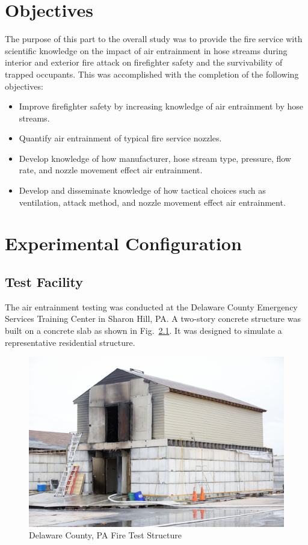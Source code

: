 \documentclass[12pt,oneside]{book}
\begin{document}
\chapter{Objectives}

The purpose of this part to the overall study was to provide the fire service with scientific knowledge on the impact of air entrainment in hose streams during interior and exterior fire attack on firefighter safety and the survivability of trapped occupants. This was accomplished with the completion of the following objectives:

\begin{itemize}
	\item Improve firefighter safety by increasing knowledge of air entrainment by hose streams.
	\item Quantify air entrainment of typical fire service nozzles. 
	\item Develop knowledge of how manufacturer, hose stream type, pressure, flow rate, and nozzle movement effect air entrainment.
	\item Develop and disseminate knowledge of how tactical choices such as ventilation, attack method, and nozzle movement effect air entrainment. 
	\end{itemize}


\chapter{Experimental Configuration}

\section{Test Facility}

The air entrainment testing was conducted at the Delaware County Emergency Services Training Center in Sharon Hill, PA. A two-story concrete structure was built on a concrete slab as shown in Fig.~\ref{fig:Delaware_County,_PA_Fire_Test_Structure}. It was designed to simulate a representative residential structure. 

\begin{figure}[!ht]
	\centering
	\includegraphics[width=\columnwidth]{Figures/Air_Entrainment/delcocorner.jpg}
	\caption{Delaware County, PA Fire Test Structure}
	\label{fig:Delaware_County,_PA_Fire_Test_Structure}
\end{figure}
\end{document}
